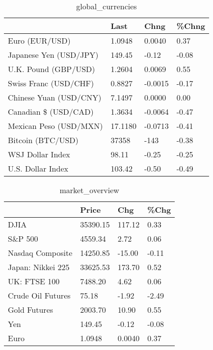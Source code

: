 \documentclass{article}%
\begin{document}
%


\begin{table}[htbp]%
\caption{global\_currencies}%
\centering%
\begin{adjustbox}{width=1\textwidth}%
\begin{tabular}{llll}
\toprule
                       &    Last &    Chng & \%Chng \\
\midrule
        Euro (EUR/USD) &  1.0948 &  0.0040 &  0.37 \\
Japanese Yen (USD/JPY) &  149.45 &   -0.12 & -0.08 \\
  U.K. Pound (GBP/USD) &  1.2604 &  0.0069 &  0.55 \\
 Swiss Franc (USD/CHF) &  0.8827 & -0.0015 & -0.17 \\
Chinese Yuan (USD/CNY) &  7.1497 &  0.0000 &  0.00 \\
  Canadian \$ (USD/CAD) &  1.3634 & -0.0064 & -0.47 \\
Mexican Peso (USD/MXN) & 17.1180 & -0.0713 & -0.41 \\
     Bitcoin (BTC/USD) &   37358 &    -143 & -0.38 \\
      WSJ Dollar Index &   98.11 &   -0.25 & -0.25 \\
     U.S. Dollar Index &  103.42 &   -0.50 & -0.49 \\
\bottomrule
\end{tabular}
%
\end{adjustbox}%
\end{table}

%


\begin{table}[htbp]%
\caption{market\_overview}%
\centering%
\begin{adjustbox}{width=1\textwidth}%
\begin{tabular}{llll}
\toprule
                  &    Price &    Chg &  \%Chg \\
\midrule
             DJIA & 35390.15 & 117.12 &  0.33 \\
          S\&P 500 &  4559.34 &   2.72 &  0.06 \\
 Nasdaq Composite & 14250.85 & -15.00 & -0.11 \\
Japan: Nikkei 225 & 33625.53 & 173.70 &  0.52 \\
     UK: FTSE 100 &  7488.20 &   4.62 &  0.06 \\
Crude Oil Futures &    75.18 &  -1.92 & -2.49 \\
     Gold Futures &  2003.70 &  10.90 &  0.55 \\
              Yen &   149.45 &  -0.12 & -0.08 \\
             Euro &   1.0948 & 0.0040 &  0.37 \\
\bottomrule
\end{tabular}
%
\end{adjustbox}%
\end{table}

%
\end{document}
